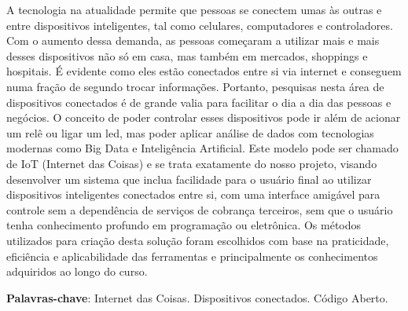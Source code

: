 \documentclass[../../layout.tex]{subfiles}
\begin{document}
\begin{resumo}
\hspace*{3em}
A tecnologia na atualidade permite que pessoas se conectem umas às outras e entre dispositivos inteligentes, tal como celulares, computadores e controladores. Com o aumento dessa demanda, as pessoas começaram a utilizar mais e mais desses dispositivos não só em casa, mas também em mercados, shoppings e hospitais. É evidente como eles estão conectados entre si via internet e conseguem numa fração de segundo trocar informações. Portanto, pesquisas nesta área de dispositivos conectados é de grande valia para facilitar o dia a dia das pessoas e negócios. O conceito de poder controlar esses dispositivos pode ir além de acionar um relê ou ligar um led, mas poder aplicar análise de dados com tecnologias modernas como Big Data e Inteligência Artificial. Este modelo pode ser chamado de IoT (Internet das Coisas) e se trata exatamente do nosso projeto, visando desenvolver um sistema que inclua facilidade para o usuário final ao utilizar dispositivos inteligentes conectados entre si, com uma interface amigável para controle sem a dependência de serviços de cobrança terceiros, sem que o usuário tenha conhecimento profundo em programação ou eletrônica. Os métodos utilizados para criação desta solução foram escolhidos com base na praticidade, eficiência e aplicabilidade das ferramentas e principalmente os conhecimentos adquiridos ao longo do curso.
\vspace{\onelineskip}

\noindent
\textbf{Palavras-chave}: Internet das Coisas. Dispositivos conectados. Código Aberto.
\end{resumo}
\end{document}
